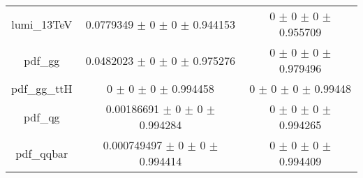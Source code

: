 \begin{table}
\begin{tabular}{ccc}
lumi\_13TeV & \num{0.0779349} $\pm$ \num{0} $\pm$ \num{0} $\pm$ \num{0.944153} & \num{0} $\pm$ \num{0} $\pm$ \num{0} $\pm$ \num{0.955709}\\
pdf\_gg & \num{0.0482023} $\pm$ \num{0} $\pm$ \num{0} $\pm$ \num{0.975276} & \num{0} $\pm$ \num{0} $\pm$ \num{0} $\pm$ \num{0.979496}\\
pdf\_gg\_ttH & \num{0} $\pm$ \num{0} $\pm$ \num{0} $\pm$ \num{0.994458} & \num{0} $\pm$ \num{0} $\pm$ \num{0} $\pm$ \num{0.99448}\\
pdf\_qg & \num{0.00186691} $\pm$ \num{0} $\pm$ \num{0} $\pm$ \num{0.994284} & \num{0} $\pm$ \num{0} $\pm$ \num{0} $\pm$ \num{0.994265}\\
pdf\_qqbar & \num{0.000749497} $\pm$ \num{0} $\pm$ \num{0} $\pm$ \num{0.994414} & \num{0} $\pm$ \num{0} $\pm$ \num{0} $\pm$ \num{0.994409}\\
\bottomrule
\end{tabular}
\end{table}